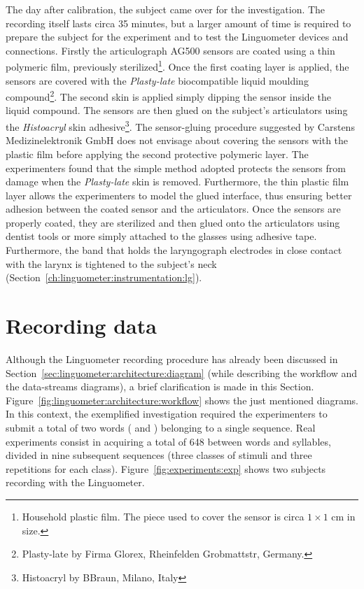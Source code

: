 
The day after calibration, the subject came over for the investigation.
The recording itself lasts circa 35 minutes, but a larger amount of time is
required to prepare the subject for the experiment and to test the Linguometer
devices and connections.
Firstly the articulograph AG500 sensors are coated using a thin polymeric 
film, previously sterilized\footnote{Household plastic film. The piece used
to cover the sensor is 
circa $1\times1$ cm in size.}. Once the first coating layer is applied, the 
sensors are covered with the \emph{Plasty-late} biocompatible liquid moulding 
compound\footnote{Plasty-late by Firma Glorex, Rheinfelden Grobmattstr, 
Germany.}. The second skin is applied simply dipping the sensor inside the
liquid compound.
The sensors are then glued on the subject's articulators using the
\emph{Histoacryl} skin adhesive\footnote{Histoacryl by BBraun, Milano, Italy}.
The sensor-gluing procedure suggested by Carstens Medizinelektronik GmbH does 
not envisage about covering the sensors with the plastic film before 
applying the second protective polymeric layer.
The experimenters found that the simple method adopted protects the sensors
from damage when the \emph{Plasty-late} skin is removed. Furthermore, the thin
plastic film layer allows the experimenters to model the glued interface,
thus ensuring better adhesion between the coated sensor and the articulators.
Once the sensors are properly coated, they are sterilized and then 
glued onto the articulators using dentist tools or more simply attached
to the glasses using adhesive tape.
Furthermore, the band that holds the laryngograph electrodes in close contact
with the larynx is tightened to the subject's neck
(Section~\ref{ch:linguometer:instrumentation:lg}).
\section{Recording data}
\label{sec:experiments:recording}
Although the Linguometer recording procedure has already been discussed in
Section~\ref{sec:linguometer:architecture:diagram} (while describing the 
workflow and the data-streams diagrams), a brief clarification is made in 
this Section. 
Figure~\ref{fig:linguometer:architecture:workflow} shows the just mentioned 
diagrams. In this context, the exemplified investigation required the
experimenters to submit a total of two words ( and ) 
belonging to a single sequence.
Real experiments consist in acquiring a total of 648 between words and
syllables, divided in nine subsequent sequences (three classes of stimuli and
three repetitions for each class).
Figure~\ref{fig:experiments:exp} shows two subjects recording with the
Linguometer.

